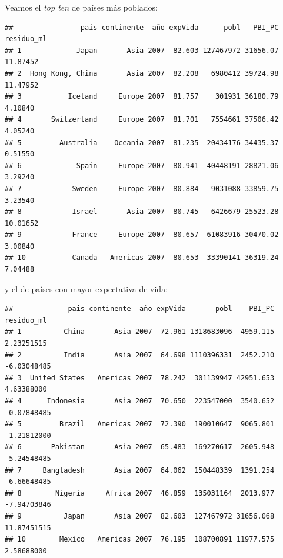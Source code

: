 \documentclass[]{book}
\newenvironment{Shaded}{\begin{snugshade}}{\end{snugshade}}
\newcommand{\KeywordTok}[1]{\textcolor[rgb]{0.13,0.29,0.53}{\textbf{#1}}}
\newcommand{\DataTypeTok}[1]{\textcolor[rgb]{0.13,0.29,0.53}{#1}}
\newcommand{\DecValTok}[1]{\textcolor[rgb]{0.00,0.00,0.81}{#1}}
\newcommand{\StringTok}[1]{\textcolor[rgb]{0.31,0.60,0.02}{#1}}
\newcommand{\OperatorTok}[1]{\textcolor[rgb]{0.81,0.36,0.00}{\textbf{#1}}}
\newcommand{\NormalTok}[1]{#1}
\begin{document}
Veamos el \emph{top ten} de países más poblados:

\begin{Shaded}
\end{Shaded}

\begin{verbatim}
##                pais continente  año expVida      pobl   PBI_PC residuo_ml
## 1             Japan       Asia 2007  82.603 127467972 31656.07   11.87452
## 2  Hong Kong, China       Asia 2007  82.208   6980412 39724.98   11.47952
## 3           Iceland     Europe 2007  81.757    301931 36180.79    4.10840
## 4       Switzerland     Europe 2007  81.701   7554661 37506.42    4.05240
## 5         Australia    Oceania 2007  81.235  20434176 34435.37    0.51550
## 6             Spain     Europe 2007  80.941  40448191 28821.06    3.29240
## 7            Sweden     Europe 2007  80.884   9031088 33859.75    3.23540
## 8            Israel       Asia 2007  80.745   6426679 25523.28   10.01652
## 9            France     Europe 2007  80.657  61083916 30470.02    3.00840
## 10           Canada   Americas 2007  80.653  33390141 36319.24    7.04488
\end{verbatim}

y el de países con mayor expectativa de vida:

\begin{Shaded}
\end{Shaded}

\begin{verbatim}
##             pais continente  año expVida       pobl    PBI_PC  residuo_ml
## 1          China       Asia 2007  72.961 1318683096  4959.115  2.23251515
## 2          India       Asia 2007  64.698 1110396331  2452.210 -6.03048485
## 3  United States   Americas 2007  78.242  301139947 42951.653  4.63388000
## 4      Indonesia       Asia 2007  70.650  223547000  3540.652 -0.07848485
## 5         Brazil   Americas 2007  72.390  190010647  9065.801 -1.21812000
## 6       Pakistan       Asia 2007  65.483  169270617  2605.948 -5.24548485
## 7     Bangladesh       Asia 2007  64.062  150448339  1391.254 -6.66648485
## 8        Nigeria     Africa 2007  46.859  135031164  2013.977 -7.94703846
## 9          Japan       Asia 2007  82.603  127467972 31656.068 11.87451515
## 10        Mexico   Americas 2007  76.195  108700891 11977.575  2.58688000
\end{verbatim}
\end{document}
